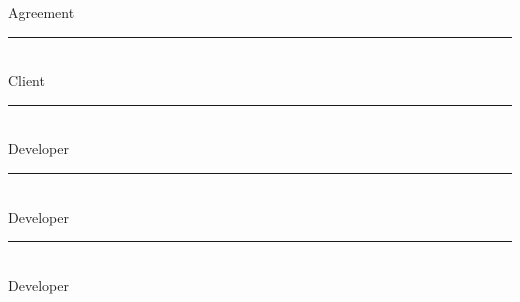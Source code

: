 \documentclass[journal,onecolumn]{IEEEtran}
\begin{document}
%



\newpage
\begin{section}{Agreement}
\textbf{ }
\vspace{5.0cm}

\noindent\rule{13cm}{0.4pt}\\
Client
\vspace{3.0cm}

\noindent\rule{13cm}{0.4pt}\\
Developer
\vspace{3.0cm}


\noindent\rule{13cm}{0.4pt}\\
Developer
\vspace{3.0cm}


\noindent\rule{13cm}{0.4pt}\\
Developer
\vspace{3.0cm}

\end{section}
\end{document}
